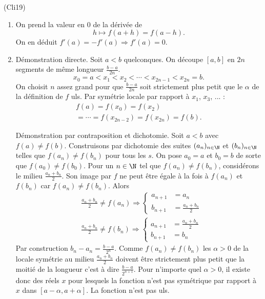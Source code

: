 \begin{tiny}(Cli19)\end{tiny}
\begin{enumerate}
  \item On prend la valeur en $0$ de la dérivée de 
  \[
    h \mapsto f(a+h) = f(a-h).
  \]
On en déduit $f'(a) = -f'(a) \Rightarrow f'(a) = 0$.
  \item Démonstration directe.\newline
  Soit $a < b$ quelconques. On découpe $[a,b]$ en $2n$ segments de même longueur $\frac{b-a}{2n}$.
  \[
    x_0 = a < x_1 < x_2 < \cdots < x_{2n-1} < x_{2n} = b.
  \]
On choisit $n$ assez grand pour que $\frac{b-a}{2n}$ soit strictement plus petit que le $\alpha$ de la définition de $f$ uls.\newline
Par symétrie locale par rapport à $x_1$, $x_3$, ... :
\begin{multline*}
  f(a) = f(x_0) = f(x_2) \\
  = \cdots =f(x_{2n-2}) = f(x_{2n}) = f(b).
\end{multline*}

Démonstration par contraposition et dichotomie.\newline
Soit $a < b$ avec $f(a) \neq f(b)$.\newline
Construisons par dichotomie des suites $(a_n)_{n\in \N}$ et $(b_n)_{n\in \N}$ telles que $f(a_n) \neq f(b_n)$ pour tous les $s$.\newline
On pose $a_0 = a$ et $b_0 = b$ de sorte que $f(a_0) \neq f(b_0)$.\newline
Pour un $n \in \N$ tel que $f(a_n) \neq f(b_n)$, considérons le milieu $\frac{a_n + b_n}{2}$. Son image par $f$ ne peut être égale à la fois à $f(a_n)$ et $f(b_n)$ car $f(a_n) \neq f(b_n)$. 
Alors
\[
\begin{aligned}
&\frac{a_n + b_n}{2} \neq f(a_n) 
  \Rightarrow
  \left\lbrace
    \begin{aligned}
    a_{n+1} &= a_n \\ b_{n+1} &= \frac{a_n + b_n}{2}
    \end{aligned}
  \right. \\
  &\frac{a_n + b_n}{2} \neq f(b_n) 
  \Rightarrow
  \left\lbrace
    \begin{aligned}
    a_{n+1} &= \frac{a_n + b_n}{2} \\ b_{n+1} &= b_n
    \end{aligned}
  \right. 
\end{aligned}
\]
Par construction $b_n - a_n = \frac{b-a}{2^n}$. Comme $f(a_n) \neq f(b_n)$ les $\alpha >0$ de la locale symétrie au milieu $\frac{a_n + b_n}{2}$ doivent être strictement plus petit que la moitié de la longueur c'est à dire $\frac{b-a}{2^{n+1}}$. Pour n'importe quel $\alpha >0$, il existe donc des réels $x$ pour lesquels la fonction n'est pas symétrique par rapport à $x$ dans $[a- \alpha, a+ \alpha]$. La fonction n'est pas uls.


\end{enumerate}
